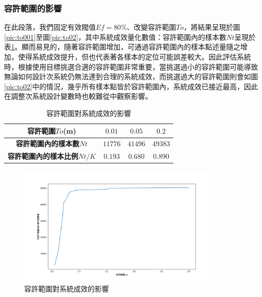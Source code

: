 \subsubsection{容許範圍的影響}
\label{chp:effect_to}

在此段落，我們固定有效閥值$Ef=80\%$、改變容許範圍$To$，將結果呈現於圖\ref{pic:to001}至圖\ref{pic:to02}，其中系統成效量化數值：容許範圍內的樣本數$Nt$呈現於表\ref{tab:ef_effect}。顯而易見的，隨著容許範圍增加，可通過容許範圍內的樣本點述量隨之增加，使得系統成效提升，但也代表著各樣本的定位可能誤差較大。因此評估系統時，根據使用目標挑選合適的容許範圍非常重要，當挑選過小的容許範圍可能導致無論如何設計次系統仍無法達到合理的系統成效，而挑選過大的容許範圍則會如圖\ref{pic:to02}中的情況，幾乎所有樣本點皆於容許範圍內，系統成效已接近最高，因此在調整次系統設計變數時也較難從中觀察影響。

\begin{table}[htpb]
    \begin{center}
      \caption{容許範圍對系統成效的影響}
      \label{tab:ef_effect}
      \begin{tabular}{|c||c|c|c|} %
        \hline  
       \textbf{容許範圍$To$(m)} 
       
       
       & $0.01$&$0.05$&$0.2$\\\hline\hline

       \textbf{容許範圍內的樣本數$Nt$} 
       & $11776$&$41496$&$49383$\\\hline
       \textbf{容許範圍內的樣本比例$Nt/K$} 
       & $0.193$&$0.680$&$0.890$\\\hline
     \end{tabular}
   \end{center}
 \end{table}

 \begin{figure}[htpb]
    \centering
    \includegraphics[width=10cm]{ch4pic/to_effect.png}
    \caption{容許範圍對系統成效的影響}
    \label{pic:to_effect}
\end{figure}

